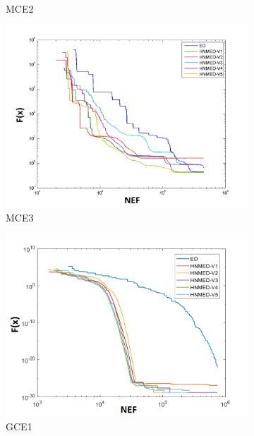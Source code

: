 \begin{figure}
\begin{subfigure}[b]{0.49\linewidth}
		\caption{MCE2} \label{fig:M2} 
	\end{subfigure}
	\begin{subfigure}[b]{0.49\linewidth}
		\includegraphics[width=\linewidth]{Figures/B-Grafica_Convergencia_Problema_3}
		\caption{MCE3} \label{fig:M3} 
	\end{subfigure}
	\begin{subfigure}[b]{0.49\linewidth}
		\includegraphics[width=\linewidth]{Figures/B-Grafica_Convergencia_Problema_4}
		\caption{GCE1} \label{fig:G1} 
	\end{subfigure}
	\begin{subfigure}[b]{0.49\linewidth}

\end{subfigure}
\end{figure}
